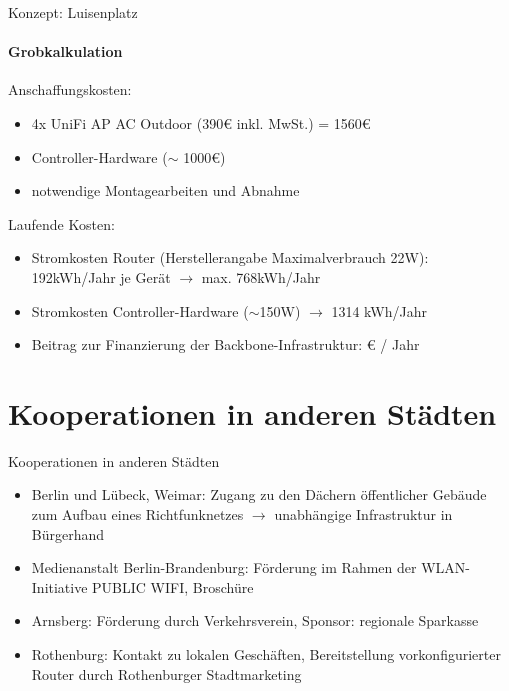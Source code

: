 \documentclass{beamer}
\begin{document}
\begin{frame}{Konzept: Luisenplatz}
\framesubtitle{Grobkalkulation}
Anschaffungskosten:
\begin{itemize}
	\item 4x UniFi AP AC Outdoor (390\euro{} inkl. MwSt.) = 1560\euro{}
	\item Controller-Hardware ($\sim$ 1000\euro{})
	\item notwendige Montagearbeiten und Abnahme
\end{itemize}
\vfill
Laufende Kosten:
\begin{itemize}
	\item Stromkosten Router (Herstellerangabe Maximalverbrauch 22W):\newline
	192kWh/Jahr je Gerät $\rightarrow$ max. 768kWh/Jahr
	\item Stromkosten Controller-Hardware \newline
	($\sim$150W) $\rightarrow$ 1314 kWh/Jahr
	\item Beitrag zur Finanzierung der Backbone-Infrastruktur:  \euro{} / Jahr
\end{itemize}
\end{frame}


\section{Kooperationen in anderen Städten}
\begin{frame}{Kooperationen in anderen Städten}
\begin{itemize}
\item Berlin und Lübeck, Weimar: Zugang zu den Dächern öffentlicher Gebäude zum Aufbau eines Richtfunknetzes \newline $\rightarrow$ unabhängige Infrastruktur in Bürgerhand
\item Medienanstalt Berlin-Brandenburg: Förderung im Rahmen der WLAN-Initiative PUBLIC WIFI, Broschüre
\item Arnsberg: Förderung durch Verkehrsverein, Sponsor: regionale Sparkasse
\item Rothenburg: Kontakt zu lokalen Geschäften, Bereitstellung vorkonfigurierter Router durch Rothenburger Stadtmarketing
\end{itemize}
\end{frame}
\end{document}

